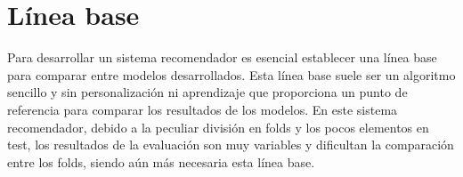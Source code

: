 


    
    



\section{Línea base}
\label{sec:linea_base}

Para desarrollar un sistema recomendador es esencial establecer una línea base para comparar entre modelos desarrollados. Esta línea base suele ser un algoritmo sencillo y sin personalización ni aprendizaje que proporciona un punto de referencia para comparar los resultados de los modelos. En este sistema recomendador, debido a la peculiar división en folds y los pocos elementos en test, los resultados de la evaluación son muy variables y dificultan la comparación entre los folds, siendo aún más necesaria esta línea base.

